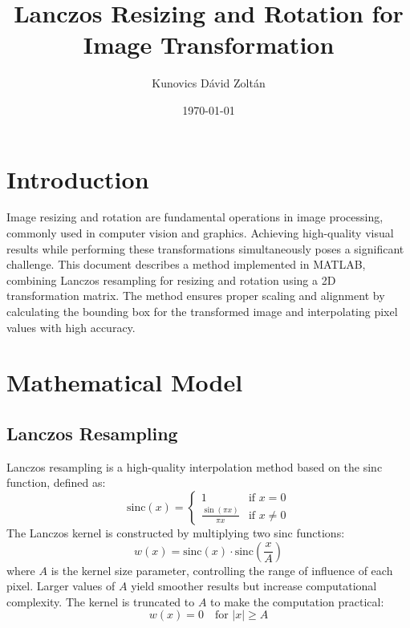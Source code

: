 \documentclass{article}
\title{Lanczos Resizing and Rotation for Image Transformation}
\author{Kunovics Dávid Zoltán}
\date{\today}
\begin{document}
\maketitle

\section{Introduction}
Image resizing and rotation are fundamental operations in image processing, commonly used in computer vision and graphics. Achieving high-quality visual results while performing these transformations simultaneously poses a significant challenge. This document describes a method implemented in MATLAB, combining Lanczos resampling for resizing and rotation using a 2D transformation matrix. The method ensures proper scaling and alignment by calculating the bounding box for the transformed image and interpolating pixel values with high accuracy.

\section{Mathematical Model}

\subsection{Lanczos Resampling}
Lanczos resampling is a high-quality interpolation method based on the sinc function, defined as:
\[
\text{sinc}(x) = 
\begin{cases} 
1 & \text{if } x = 0 \\
\frac{\sin(\pi x)}{\pi x} & \text{if } x \neq 0 
\end{cases}
\]
The Lanczos kernel is constructed by multiplying two sinc functions:
\[
w(x) = \text{sinc}(x) \cdot \text{sinc}\left(\frac{x}{A}\right)
\]
where \(A\) is the kernel size parameter, controlling the range of influence of each pixel. Larger values of \(A\) yield smoother results but increase computational complexity. The kernel is truncated to \(A\) to make the computation practical:
\[
w(x) = 0 \quad \text{for } |x| \geq A
\]
\end{document}
